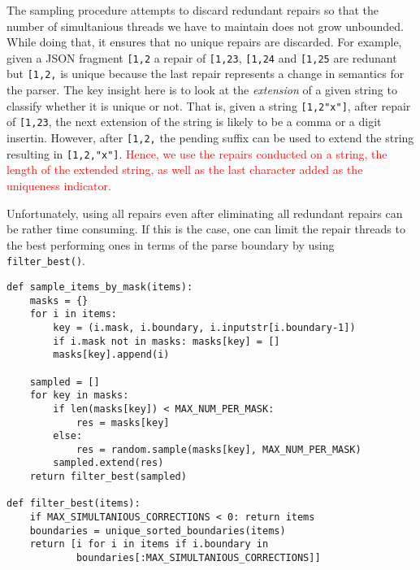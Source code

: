 \documentclass[sigconf,review,anonymous]{acmart}
\def\<#1>{\texttt{#1}}
\newcounter{todocounter}
\newcommand{\todo}[1]{\marginpar{$|$}\textcolor{red}{\stepcounter{todocounter}\footnote[\thetodocounter]{\textcolor{red}{\textbf{TODO }}\textit{#1}}}}
\newcommand{\recheck}[1]{\textcolor{red}{#1}}
\renewcommand{\todo}[1]{}
\newcommand{\approach}{\textsc{BRepair}\xspace}
\begin{document}
The sampling procedure attempts to discard redundant repairs so that the number
of simultanious threads we have to maintain does not grow unbounded. While doing
that, it ensures that no unique repairs are discarded. For
example, given a JSON fragment \<[1,2> a repair of \<[1,23>, \<[1,24>
and \<[1,25> are redunant but \<[1,2,> is unique because the last repair
represents a change in semantics for the parser. The key insight here is to
look at the \emph{extension} of a given string to classify whether it is unique
or not. That is, given a string \<[1,2"x"]>, after repair of \<[1,23>, the next
extension of the string is likely to be a comma or a digit insertin. However,
after \<[1,2,> the pending suffix can be used to extend the string resulting in
\<[1,2,"x"]>. \recheck{Hence, we use the repairs conducted on a string, the
length of the extended string, as well as the last character added as the
uniqueness indicator.}\todo{@Lukas: does the new implementation contain this check? I cant remember this check in the old implementation of \approach?}

Unfortunately, using all repairs even after eliminating all redundant repairs
can be rather time consuming. If this is the case, one can limit the repair
threads to the best performing ones in terms of the parse boundary by using
\<filter\_best()>.

\begin{lstlisting}[caption=Sampling,label={lst:sampling}]
def sample_items_by_mask(items):
    masks = {}
    for i in items:
        key = (i.mask, i.boundary, i.inputstr[i.boundary-1])
        if i.mask not in masks: masks[key] = []
        masks[key].append(i)

    sampled = []
    for key in masks:
        if len(masks[key]) < MAX_NUM_PER_MASK:
            res = masks[key]
        else:
            res = random.sample(masks[key], MAX_NUM_PER_MASK)
        sampled.extend(res)
    return filter_best(sampled)

def filter_best(items):
    if MAX_SIMULTANIOUS_CORRECTIONS < 0: return items
    boundaries = unique_sorted_boundaries(items)
    return [i for i in items if i.boundary in
            boundaries[:MAX_SIMULTANIOUS_CORRECTIONS]]
\end{lstlisting}
\end{document}
